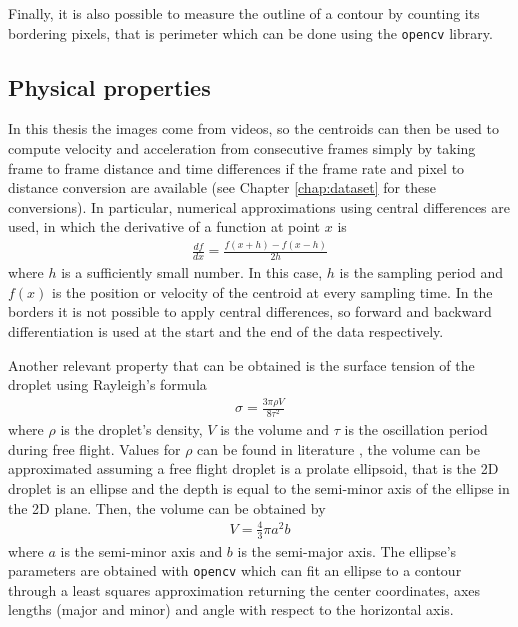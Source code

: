 Finally, it is also possible to measure the outline of a contour by counting its bordering pixels, that is perimeter which can be done using the \texttt{opencv} library.

\subsection{Physical properties}\label{sec:physical}
In this thesis the images come from videos, so the centroids can then be used to compute velocity and acceleration from consecutive frames simply by taking frame to frame distance and time differences if the frame rate and pixel to distance conversion are available (see Chapter \ref{chap:dataset} for these conversions). In particular, numerical approximations using central differences are used, in which the derivative of a function at point $x$ is
\begin{align*}
    \frac{df}{dx}=\frac{f(x+h)-f(x-h)}{2h}
\end{align*}
where $h$ is a sufficiently small number. In this case, $h$ is the sampling period and $f(x)$ is the position or velocity of the centroid at every sampling time. In the borders it is not possible to apply central differences, so forward and backward differentiation is used at the start and the end of the data respectively.

Another relevant property that can be obtained is the surface tension of the droplet using Rayleigh's formula \cite{rayleigh}
\begin{align}\label{eq:rayleigh}
    \sigma = \frac{3\pi \rho V}{8\tau^2}
\end{align}
where $\rho$ is the droplet's density, $V$ is the volume and $\tau$ is the oscillation period during free flight. Values for $\rho$ can be found in literature \cite{surface_tension}, the volume can be approximated assuming a free flight droplet is a prolate ellipsoid, that is the 2D droplet is an ellipse and the depth is equal to the semi-minor axis of the ellipse in the 2D plane. Then, the volume can be obtained by
\begin{align}\label{eq:vol}
    V=\frac{4}{3}\pi a^2b
\end{align}
where $a$ is the semi-minor axis and $b$ is the semi-major axis. The ellipse's parameters are obtained with \texttt{opencv} which can fit an ellipse to a contour through a least squares approximation returning the center coordinates, axes lengths (major and minor) and angle with respect to the horizontal axis.

